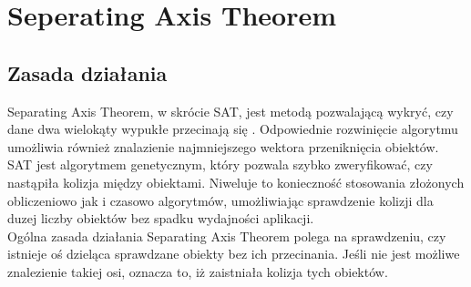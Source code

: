 \chapter{Seperating Axis Theorem}

\section{Zasada działania}
Separating Axis Theorem, w skrócie SAT, jest metodą pozwalającą wykryć, czy dane dwa wielokąty wypukłe przecinają się \cite{SAT}. Odpowiednie rozwinięcie algorytmu umożliwia również znalazienie najmniejszego wektora przeniknięcia obiektów.  SAT jest algorytmem genetycznym, który pozwala szybko zweryfikować, czy nastąpiła kolizja między obiektami. Niweluje to konieczność stosowania złożonych obliczeniowo jak i czasowo algorytmów, umożliwiając sprawdzenie kolizji dla duzej liczby obiektów bez spadku wydajności aplikacji.\\
Ogólna zasada działania Separating Axis Theorem polega na sprawdzeniu, czy istnieje oś dzieląca sprawdzane obiekty bez ich przecinania. Jeśli nie jest możliwe znalezienie takiej osi, oznacza to, iż zaistniała kolizja tych obiektów.

